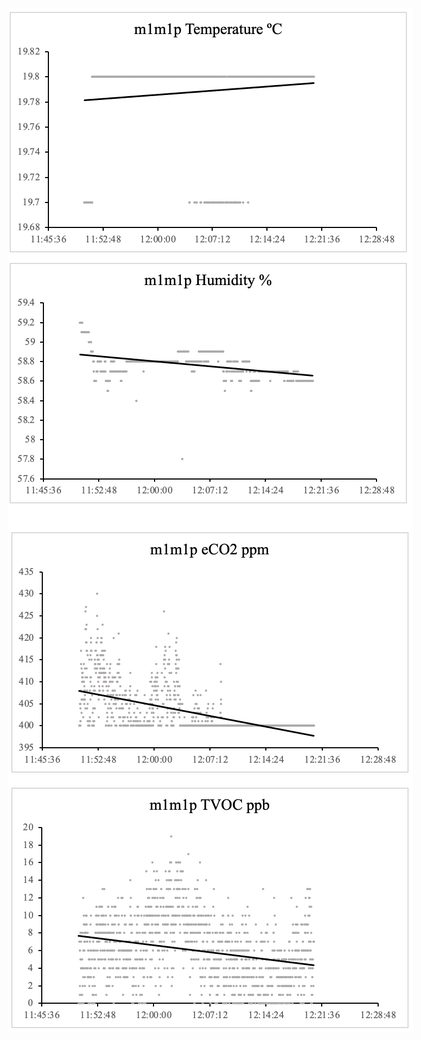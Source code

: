 \documentclass{ueacmpstyle}
\begin{document}
            \includegraphics[scale=0.3]{Images/m1m1p.png}
\end{document}
